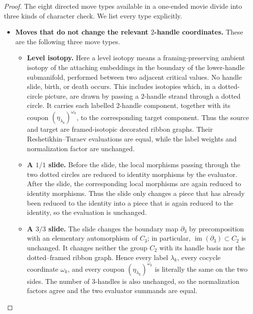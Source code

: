 \begin{proof}
The eight directed move types available in a one-ended movie divide into
three kinds of character check.  We list every type explicitly.

\begin{itemize}
\item \textbf{Moves that do not change the relevant \(2\)-handle
coordinates.}
These are the following three move types.
\begin{itemize}
  \item \textbf{Level isotopy.}
  Here a level isotopy means a framing-preserving ambient isotopy of the
  attaching embeddings in the boundary of the lower-handle submanifold,
  performed between two adjacent critical values.  No handle slide, birth,
  or death occurs.  This includes isotopies which, in a dotted-circle picture,
  are drawn by passing a \(2\)-handle strand through a dotted circle.
  It carries each labelled \(2\)-handle component, together with its coupon
  \((\eta_{\lambda_k})^{\omega_k}\), to the corresponding target component.
  Thus the source and target are framed-isotopic decorated ribbon graphs.
  Their Reshetikhin--Turaev evaluations are equal, while the label weights and
  normalization factor are unchanged.

  \item \textbf{A \(1/1\) slide.}
  Before the slide, the local morphisms passing through the two dotted circles
  are reduced to identity morphisms by the evaluator.  After the slide, the
  corresponding local morphisms are again reduced to identity morphisms.
  Thus the slide only changes a piece that has already been reduced to the
  identity into a piece that is again reduced to the identity, so the
  evaluation is unchanged.

  \item \textbf{A \(3/3\) slide.}
  The slide changes the boundary map \(\partial_3\) by precomposition with an
  elementary automorphism of \(C_3\); in particular,
  \(\operatorname{im}(\partial_3)\subset C_2\) is unchanged.  It changes
  neither the group \(C_2\) with its handle basis nor the dotted--framed
  ribbon graph.  Hence every label \(\lambda_k\), every cocycle coordinate
  \(\omega_k\), and every coupon
  \((\eta_{\lambda_k})^{\omega_k}\) is literally the same on the two sides.
  The number of \(3\)-handles is also unchanged, so the normalization factors
  agree and the two evaluator summands are equal.
\end{itemize}


\end{itemize}
\end{proof}
